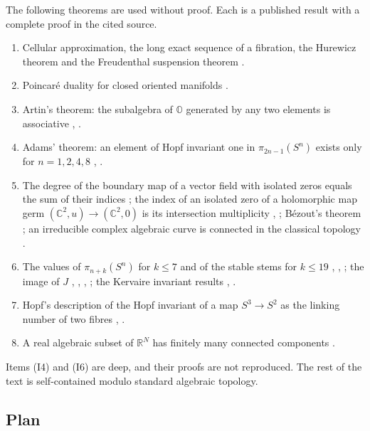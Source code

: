 \documentclass[11pt]{amsart}
\numberwithin{equation}{section}
\theoremstyle{plain}
\theoremstyle{definition}
\theoremstyle{remark}
\newcommand{\R}{\mathbb{R}}
\newcommand{\C}{\mathbb{C}}
\newcommand{\Oc}{\mathbb{O}}
\begin{document}
The following theorems are used without proof. Each is a published result with a complete proof in the cited source.
\begin{enumerate}[label=(I\arabic*)]
\item Cellular approximation, the long exact sequence of a fibration, the Hurewicz theorem and the Freudenthal suspension theorem \cite[Chapter~4]{Hat02}.
\item Poincar\'e duality for closed oriented manifolds \cite[Section~3.3]{Hat02}.
\item Artin's theorem: the subalgebra of $\Oc$ generated by any two elements is associative \cite[Chapter~III]{Sch66}, \cite{Bae02}.
\item Adams' theorem: an element of Hopf invariant one in $\pi_{2n-1}(S^n)$ exists only for $n=1,2,4,8$ \cite{Ada60}, \cite{AA66}.
\item The degree of the boundary map of a vector field with isolated zeros equals the sum of their indices \cite[Section~6]{Mil65}; the index of an isolated zero of a holomorphic map germ $(\C^2,u)\to(\C^2,0)$ is its intersection multiplicity \cite[Chapter~5]{GH78}, \cite[Chapter~5]{AGV85}; B\'ezout's theorem \cite[Chapter~5]{Ful69}; an irreducible complex algebraic curve is connected in the classical topology \cite[Corollary~(4.16)]{Mum76}.
\item The values of $\pi_{n+k}(S^n)$ for $k\le 7$ and of the stable stems for $k\le19$ \cite{Tod62}, \cite{Rav86}, \cite{IWX23}; the image of $J$ \cite{Ada66}, \cite{Qui71}, \cite{Sul74}, \cite{BG75}; the Kervaire invariant results \cite{Bro69}, \cite{HHR16}.
\item Hopf's description of the Hopf invariant of a map $S^3\to S^2$ as the linking number of two fibres \cite{Hop31}, \cite[Section~17]{BT82}.
\item A real algebraic subset of $\R^N$ has finitely many connected components \cite[Theorem~2.4.4]{BCR98}.
\end{enumerate}
Items (I4) and (I6) are deep, and their proofs are not reproduced. The rest of the text is self-contained modulo standard algebraic topology.

\subsection{Plan}
\end{document}
